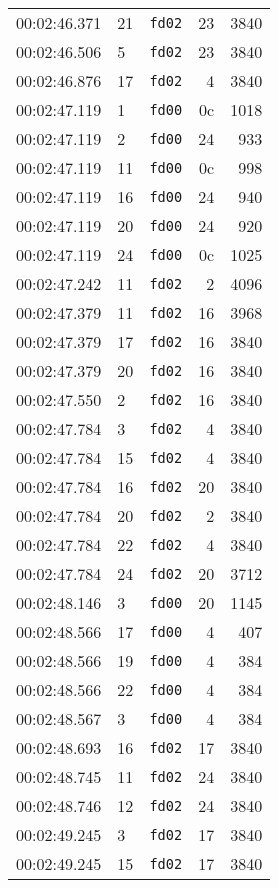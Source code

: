 \documentclass{article}
\begin{document}
\begin{longtable}{lllrr}
00:02:46.371 & 21 & \texttt{fd02} & 23 & 3840 \\
00:02:46.506 & 5 & \texttt{fd02} & 23 & 3840 \\
00:02:46.876 & 17 & \texttt{fd02} & 4 & 3840 \\
00:02:47.119 & 1 & \texttt{fd00} & 0c & 1018 \\
00:02:47.119 & 2 & \texttt{fd00} & 24 & 933 \\
00:02:47.119 & 11 & \texttt{fd00} & 0c & 998 \\
00:02:47.119 & 16 & \texttt{fd00} & 24 & 940 \\
00:02:47.119 & 20 & \texttt{fd00} & 24 & 920 \\
00:02:47.119 & 24 & \texttt{fd00} & 0c & 1025 \\
00:02:47.242 & 11 & \texttt{fd02} & 2 & 4096 \\
00:02:47.379 & 11 & \texttt{fd02} & 16 & 3968 \\
00:02:47.379 & 17 & \texttt{fd02} & 16 & 3840 \\
00:02:47.379 & 20 & \texttt{fd02} & 16 & 3840 \\
00:02:47.550 & 2 & \texttt{fd02} & 16 & 3840 \\
00:02:47.784 & 3 & \texttt{fd02} & 4 & 3840 \\
00:02:47.784 & 15 & \texttt{fd02} & 4 & 3840 \\
00:02:47.784 & 16 & \texttt{fd02} & 20 & 3840 \\
00:02:47.784 & 20 & \texttt{fd02} & 2 & 3840 \\
00:02:47.784 & 22 & \texttt{fd02} & 4 & 3840 \\
00:02:47.784 & 24 & \texttt{fd02} & 20 & 3712 \\
00:02:48.146 & 3 & \texttt{fd00} & 20 & 1145 \\
00:02:48.566 & 17 & \texttt{fd00} & 4 & 407 \\
00:02:48.566 & 19 & \texttt{fd00} & 4 & 384 \\
00:02:48.566 & 22 & \texttt{fd00} & 4 & 384 \\
00:02:48.567 & 3 & \texttt{fd00} & 4 & 384 \\
00:02:48.693 & 16 & \texttt{fd02} & 17 & 3840 \\
00:02:48.745 & 11 & \texttt{fd02} & 24 & 3840 \\
00:02:48.746 & 12 & \texttt{fd02} & 24 & 3840 \\
00:02:49.245 & 3 & \texttt{fd02} & 17 & 3840 \\
00:02:49.245 & 15 & \texttt{fd02} & 17 & 3840 \\

\end{longtable}
\end{document}

